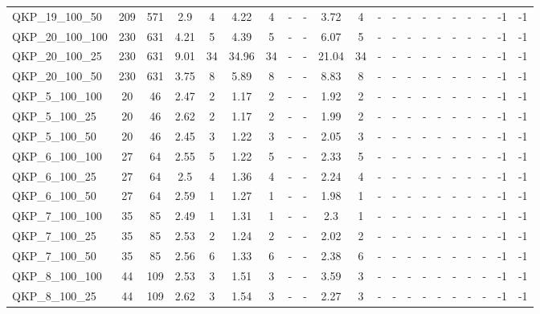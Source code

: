 \begin{sidewaystable}[!ht]
{\begin{tabular}{lcccccccccccccccccccc}
QKP\_19\_100\_50 & 209 & 571 &  \textcolor{blue2}{2.9} & 4 & 4.22 & 4 &  - &  - & 3.72 & 4 &  - &  - &  - &  - &  - &  - &  - &  - & -1 & -1 \\
QKP\_20\_100\_100 & 230 & 631 &  \textcolor{blue2}{4.21} & 5 & 4.39 & 5 &  - &  - & 6.07 & 5 &  - &  - &  - &  - &  - &  - &  - &  - & -1 & -1 \\
QKP\_20\_100\_25 & 230 & 631 &  \textcolor{blue2}{9.01} & 34 & 34.96 & 34 &  - &  - & 21.04 & 34 &  - &  - &  - &  - &  - &  - &  - &  - & -1 & -1 \\
QKP\_20\_100\_50 & 230 & 631 &  \textcolor{blue2}{3.75} & 8 & 5.89 & 8 &  - &  - & 8.83 & 8 &  - &  - &  - &  - &  - &  - &  - &  - & -1 & -1 \\
QKP\_5\_100\_100 & 20 & 46 & 2.47 & 2 &  \textcolor{blue2}{1.17} & 2 &  - &  - & 1.92 & 2 &  - &  - &  - &  - &  - &  - &  - &  - & -1 & -1 \\
QKP\_5\_100\_25 & 20 & 46 & 2.62 & 2 &  \textcolor{blue2}{1.17} & 2 &  - &  - & 1.99 & 2 &  - &  - &  - &  - &  - &  - &  - &  - & -1 & -1 \\
QKP\_5\_100\_50 & 20 & 46 & 2.45 & 3 &  \textcolor{blue2}{1.22} & 3 &  - &  - & 2.05 & 3 &  - &  - &  - &  - &  - &  - &  - &  - & -1 & -1 \\
QKP\_6\_100\_100 & 27 & 64 & 2.55 & 5 &  \textcolor{blue2}{1.22} & 5 &  - &  - & 2.33 & 5 &  - &  - &  - &  - &  - &  - &  - &  - & -1 & -1 \\
QKP\_6\_100\_25 & 27 & 64 & 2.5 & 4 &  \textcolor{blue2}{1.36} & 4 &  - &  - & 2.24 & 4 &  - &  - &  - &  - &  - &  - &  - &  - & -1 & -1 \\
QKP\_6\_100\_50 & 27 & 64 & 2.59 & 1 &  \textcolor{blue2}{1.27} & 1 &  - &  - & 1.98 & 1 &  - &  - &  - &  - &  - &  - &  - &  - & -1 & -1 \\
QKP\_7\_100\_100 & 35 & 85 & 2.49 & 1 &  \textcolor{blue2}{1.31} & 1 &  - &  - & 2.3 & 1 &  - &  - &  - &  - &  - &  - &  - &  - & -1 & -1 \\
QKP\_7\_100\_25 & 35 & 85 & 2.53 & 2 &  \textcolor{blue2}{1.24} & 2 &  - &  - & 2.02 & 2 &  - &  - &  - &  - &  - &  - &  - &  - & -1 & -1 \\
QKP\_7\_100\_50 & 35 & 85 & 2.56 & 6 &  \textcolor{blue2}{1.33} & 6 &  - &  - & 2.38 & 6 &  - &  - &  - &  - &  - &  - &  - &  - & -1 & -1 \\
QKP\_8\_100\_100 & 44 & 109 & 2.53 & 3 &  \textcolor{blue2}{1.51} & 3 &  - &  - & 3.59 & 3 &  - &  - &  - &  - &  - &  - &  - &  - & -1 & -1 \\
QKP\_8\_100\_25 & 44 & 109 & 2.62 & 3 &  \textcolor{blue2}{1.54} & 3 &  - &  - & 2.27 & 3 &  - &  - &  - &  - &  - &  - &  - &  - & -1 & -1 \\

\end{tabular}}
\end{sidewaystable}
